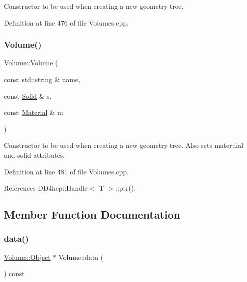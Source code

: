 Constructor to be used when creating a new geometry tree. 



Definition at line 476 of file Volumes.\+cpp.

\hypertarget{class_d_d4hep_1_1_geometry_1_1_volume_aa03cf0a05a1f926bd4fb605178ae39ce}{}\label{class_d_d4hep_1_1_geometry_1_1_volume_aa03cf0a05a1f926bd4fb605178ae39ce} 
\subsubsection{\texorpdfstring{Volume()}{Volume()}\hspace{0.1cm}{\footnotesize\ttfamily [6/6]}}
{\footnotesize\ttfamily Volume\+::\+Volume (\begin{DoxyParamCaption}\item[{const std\+::string \&}]{name,  }\item[{const \hyperlink{namespace_d_d4hep_1_1_geometry_a83de90a8dcc7378ba47d54ef9a6a687b}{Solid} \&}]{s,  }\item[{const \hyperlink{class_d_d4hep_1_1_geometry_1_1_material}{Material} \&}]{m }\end{DoxyParamCaption})}



Constructor to be used when creating a new geometry tree. Also sets materuial and solid attributes. 



Definition at line 481 of file Volumes.\+cpp.



References D\+D4hep\+::\+Handle$<$ T $>$\+::ptr().



\subsection{Member Function Documentation}
\hypertarget{class_d_d4hep_1_1_geometry_1_1_volume_a0e888def458bf5d98a55fc57f2e01aac}{}\label{class_d_d4hep_1_1_geometry_1_1_volume_a0e888def458bf5d98a55fc57f2e01aac} 
\subsubsection{\texorpdfstring{data()}{data()}}
{\footnotesize\ttfamily \hyperlink{class_d_d4hep_1_1_geometry_1_1_volume_a12968f95257e99e277f773ccf6d58ee5}{Volume\+::\+Object} $\ast$ Volume\+::data (\begin{DoxyParamCaption}{ }\end{DoxyParamCaption}) const}



